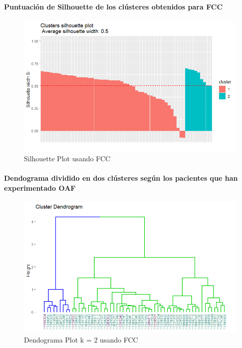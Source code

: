 \paragraph{Puntuación de Silhouette de los clústeres obtenidos para FCC}

\begin{figure}[H]
    \centering
    \includegraphics[scale = 0.8]{img/06-3-ccf.png}
    \caption{Silhouette Plot usando FCC}
    \label{fig:ccf_si}
\end{figure}

\paragraph{Dendograma dividido en dos clústeres según los pacientes que han experimentado OAF}

\begin{figure}[H]
    \centering
    \includegraphics[scale = 0.8]{img/06-4-ccf.png}
    \caption{Dendograma Plot k = 2 usando FCC}
    \label{fig:ccf_ctg}
\end{figure}

